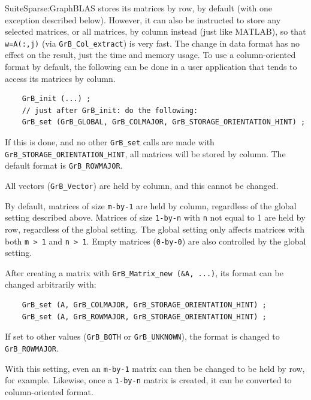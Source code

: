 SuiteSparse:GraphBLAS stores its matrices by row, by default (with one
exception described below).  However, it can also be instructed to store any
selected matrices, or all matrices, by column instead (just like MATLAB), so
that \verb'w=A(:,j)' (via \verb'GrB_Col_extract') is very fast.  The change in
data format has no effect on the result, just the time and memory usage.  To
use a column-oriented format by default, the following can be done in a user
application that tends to access its matrices by column.

    {\footnotesize
    \begin{verbatim}
    GrB_init (...) ;
    // just after GrB_init: do the following:
    GrB_set (GrB_GLOBAL, GrB_COLMAJOR, GrB_STORAGE_ORIENTATION_HINT) ; \end{verbatim} }

If this is done, and no other \verb'GrB_set' calls are made with \newline
\verb'GrB_STORAGE_ORIENTATION_HINT', all matrices will be stored by column.
The default format is \verb'GrB_ROWMAJOR'.

All vectors (\verb'GrB_Vector') are held by column, and this cannot be changed.

By default, matrices of size \verb'm-by-1' are held by column, regardless of
the global setting described above.  Matrices of size \verb'1-by-n' with
\verb'n' not equal to 1 are held by row, regardless of the global setting.
The global setting only affects matrices with both \verb'm > 1' and \verb'n > 1'.
Empty matrices (\verb'0-by-0') are also controlled by the global setting.

After creating a matrix with \verb'GrB_Matrix_new (&A, ...)',
its format can be changed arbitrarily with:

    {\footnotesize
    \begin{verbatim}
    GrB_set (A, GrB_COLMAJOR, GrB_STORAGE_ORIENTATION_HINT) ;
    GrB_set (A, GrB_ROWMAJOR, GrB_STORAGE_ORIENTATION_HINT) ; \end{verbatim} }

If set to other values (\verb'GrB_BOTH' or \verb'GrB_UNKNOWN'), the
format is changed to \verb'GrB_ROWMAJOR'.

With this setting, even an \verb'm-by-1' matrix can then be changed to be held
by row, for example.  Likewise, once a \verb'1-by-n' matrix is created, it can
be converted to column-oriented format.

